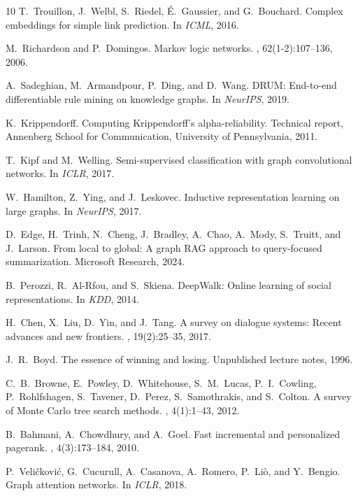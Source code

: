 \documentclass[10pt,twocolumn]{article}
\begin{document}
\begin{thebibliography}{10}
T.~Trouillon, J.~Welbl, S.~Riedel, É.~Gaussier, and G.~Bouchard.
\newblock Complex embeddings for simple link prediction.
\newblock In {\em ICML}, 2016.

M.~Richardson and P.~Domingos.
\newblock Markov logic networks.
, 62(1-2):107--136, 2006.

A.~Sadeghian, M.~Armandpour, P.~Ding, and D.~Wang.
\newblock DRUM: End-to-end differentiable rule mining on knowledge graphs.
\newblock In {\em NeurIPS}, 2019.

K.~Krippendorff.
\newblock Computing Krippendorff's alpha-reliability.
\newblock Technical report, Annenberg School for Communication, University of Pennsylvania, 2011.

T.~Kipf and M.~Welling.
\newblock Semi-supervised classification with graph convolutional networks.
\newblock In {\em ICLR}, 2017.

W.~Hamilton, Z.~Ying, and J.~Leskovec.
\newblock Inductive representation learning on large graphs.
\newblock In {\em NeurIPS}, 2017.

D.~Edge, H.~Trinh, N.~Cheng, J.~Bradley, A.~Chao, A.~Mody, S.~Truitt, and J.~Larson.
\newblock From local to global: A graph RAG approach to query-focused summarization.
\newblock Microsoft Research, 2024.

B.~Perozzi, R.~Al-Rfou, and S.~Skiena.
\newblock DeepWalk: Online learning of social representations.
\newblock In {\em KDD}, 2014.

H.~Chen, X.~Liu, D.~Yin, and J.~Tang.
\newblock A survey on dialogue systems: Recent advances and new frontiers.
, 19(2):25--35, 2017.

J.~R.~Boyd.
\newblock The essence of winning and losing.
\newblock Unpublished lecture notes, 1996.

C.~B.~Browne, E.~Powley, D.~Whitehouse, S.~M.~Lucas, P.~I.~Cowling, P.~Rohlfshagen, S.~Tavener, D.~Perez, S.~Samothrakis, and S.~Colton.
\newblock A survey of Monte Carlo tree search methods.
, 4(1):1--43, 2012.

B.~Bahmani, A.~Chowdhury, and A.~Goel.
\newblock Fast incremental and personalized pagerank.
, 4(3):173--184, 2010.

P.~Veličković, G.~Cucurull, A.~Casanova, A.~Romero, P.~Liò, and Y.~Bengio.
\newblock Graph attention networks.
\newblock In {\em ICLR}, 2018.

\end{thebibliography}
\end{document}
